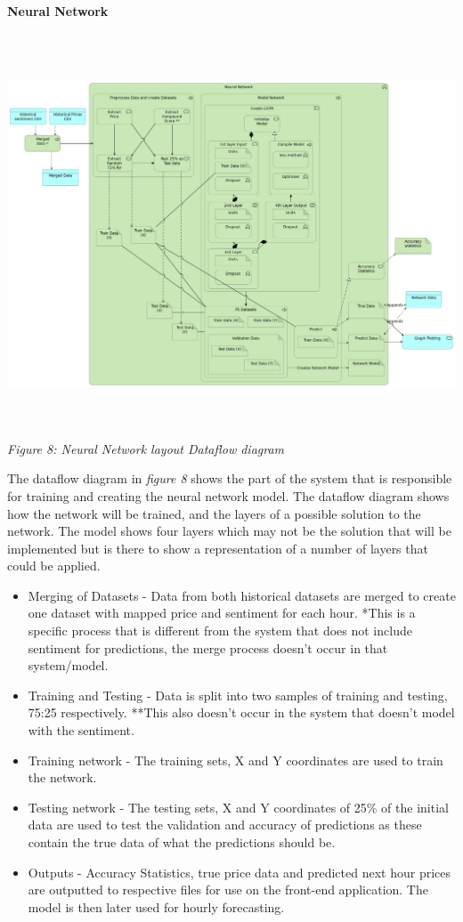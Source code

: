 \documentclass[oneside, 12pt]{article}
\begin{document}
		\textbf{Neural Network}
		\begin{center}
			\includegraphics[width=17cm,height=12cm]{images/Neural_Network.png}
			\textit{Figure 8: Neural Network layout Dataflow diagram}
		\end{center}
		The dataflow diagram in \textit{figure 8} shows the part of the system that is responsible for training and creating the neural network model. The dataflow diagram shows how the network will be trained, and the layers of a possible solution to the network. The model shows four layers which may not be the solution that will be implemented but is there to show a representation of a number of layers that could be applied.
		\begin{itemize}
			\item Merging of Datasets - Data from both historical datasets are merged to create one dataset with mapped price and sentiment for each hour. *This is a specific process that is different from the system that does not include sentiment for predictions, the merge process doesn't occur in that system/model.
			\item Training and Testing - Data is split into two samples of training and testing, 75:25 respectively. **This also doesn't occur in the system that doesn't model with the sentiment.
			\item Training network - The training sets, X and Y coordinates are used to train the network.
			\item Testing network - The testing sets, X and Y coordinates of 25\% of the initial data are used to test the validation and accuracy of predictions as these contain the true data of what the predictions should be.
			\item Outputs - Accuracy Statistics, true price data and predicted next hour prices are outputted to respective files for use on the front-end application. The model is then later used for hourly forecasting. 
		\end{itemize}
		
\end{document}
